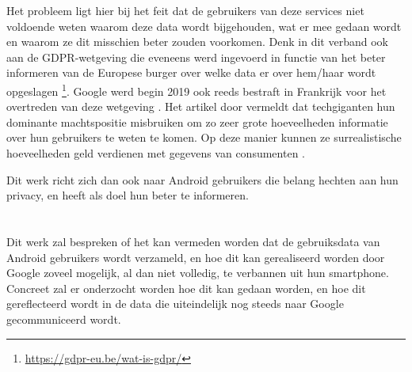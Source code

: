 Het probleem ligt hier bij het feit dat de gebruikers van deze services niet voldoende weten waarom deze data wordt bijgehouden, wat er mee gedaan wordt en waarom ze dit misschien beter zouden voorkomen. Denk in dit verband ook aan de GDPR-wetgeving die eveneens werd ingevoerd in functie van het beter informeren van de Europese burger over welke data er over hem/haar wordt opgeslagen \footnote{\url{https://gdpr-eu.be/wat-is-gdpr/}}. Google werd begin 2019 ook reeds bestraft in Frankrijk voor het overtreden van deze wetgeving \autocite{Boete2019}. Het artikel door \cite{LaurensVerhagen2019} vermeldt dat techgiganten hun dominante machtspositie misbruiken om zo zeer grote hoeveelheden informatie over hun gebruikers te weten te komen. Op deze manier kunnen ze surrealistische hoeveelheden geld verdienen met gegevens van consumenten \autocite{propken_google-data}. 

Dit werk richt zich dan ook naar Android gebruikers die belang hechten aan hun privacy, en heeft als doel hun beter te informeren.


\section{}
\label{sec:onderzoeksvraag}

Dit werk zal bespreken of het kan vermeden worden dat de gebruiksdata van Android gebruikers wordt verzameld, en hoe dit kan gerealiseerd worden door Google zoveel mogelijk, al dan niet volledig, te verbannen uit hun smartphone. Concreet zal er onderzocht worden hoe dit kan gedaan worden, en hoe dit gereflecteerd wordt in de data die uiteindelijk nog steeds naar Google gecommuniceerd wordt.

